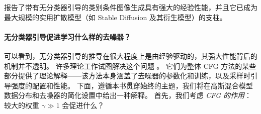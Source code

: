 \documentclass[../../book-main_zh.tex]{subfiles}
\begin{document}
\begin{algorithm}
    \caption{使用分类数据和类别条件去噪器进行条件采样。}
    \label{alg:iterative_denoising_conditional_CFG}
    \begin{algorithmic}[1]
        \EndFor
        \EndFunction
    \end{algorithmic}
\end{algorithm}

\textcite{Ho2022-ry} 报告了带有无分类器引导的类别条件图像生成具有强大的经验性能，并且它已成为最大规模的实用扩散模型（如 Stable Diffusion \cite{rombach2022high} 及其衍生模型）的支柱。

\paragraph{无分类器引导促进学习什么样的去噪器？}
可以看到，无分类器引导的推导在很大程度上是由经验驱动的，其强大性能背后的机制并不透明。
许多理论工作试图解决这个问题 \cite{Bradley2024-jg,Li2025-li,Wu2024-js}。
它们为整体 CFG 方法的某些部分提供了理论解释——该方法本身涵盖了去噪器的参数化和训练，以及采样时引导强度的配置和性能。
下面，遵循本书贯穿始终的主题，我们将在高斯混合模型数据分布和去噪器的简化设置中给出一种解释。
首先，我们考虑 \textit{CFG 的作用}：较大的权重 $\gamma \gg 1$ 会促进什么？
\end{document}
